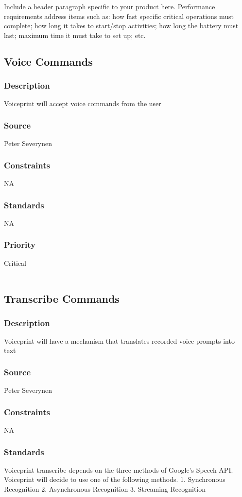 Include a header paragraph specific to your product here. Performance requirements address items such as: how fast specific critical operations must complete; how long it takes to start/stop activities; how long the battery must last; maximum time it must take to set up; etc.

\subsection{Voice Commands}
\subsubsection{Description}
Voiceprint will accept voice commands from the user
\subsubsection{Source}
Peter Severynen
\subsubsection{Constraints}
NA
\subsubsection{Standards}
NA
\subsubsection{Priority}
Critical \\
\\
\subsection{Transcribe Commands}
\subsubsection{Description}
Voiceprint will have a mechanism that translates recorded voice prompts into text
\subsubsection{Source}
Peter Severynen
\subsubsection{Constraints}
NA
\subsubsection{Standards}
Voiceprint transcribe depends on the three methods of Google's Speech API. Voiceprint will decide to use one of the following methods.
1. Synchronous Recognition
2. Asynchronous Recognition
3. Streaming Recognition

